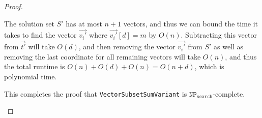 \documentclass[11pt]{scrartcl}
\theoremstyle{dotlessP}
\theoremstyle{dotlessN}
\newcommand{\npc}{\texttt{NP}_\texttt{search}\text{-complete}}
\begin{document}
\begin{proof}
\begin{enumerate}[1.]
\begin{subproof}
				The solution set $S'$ has at most $n+1$ vectors, and thus we can bound the time it takes to find the vector $\vec{v_i'}$ where $\vec{v_i'}[d] = m$ by $O(n)$. Subtracting this vector from $\vec{t'}$ will take $O(d)$, and then removing the vector $\vec{v_i'}$ from $S'$ as well as removing the last coordinate for all remaining vectors will take $O(n)$, and thus the total runtime is $O(n) + O(d) + O(n) = O(n + d)$, which is polynomial time.
			\end{subproof}
			This completes the proof that \texttt{VectorSubsetSumVariant} is $\npc$.
	\end{enumerate}
\end{proof}
\end{document}
